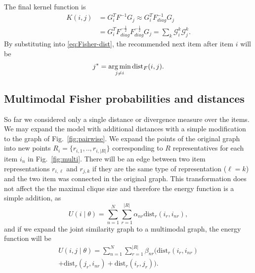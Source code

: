 The final kernel function is
%
\begin{equation}
\begin{split}
K(i,j) &= G_i^T F^{-1} G_j \approx G_i^T F_{diag}^{-1} G_j \\
	   &= G_i^T F_{diag}^{-\frac 12} F_{diag}^{-\frac 12} G_j = \sum_k \mathcal{G}_i^k \mathcal{G}_j^k.
\end{split}
\nonumber
\end{equation}
By substituting into \eqref{eq:Fisher-dist}, the recommended next item after item $i$ will be
%
\begin{equation}
j^{*} = \operatorname*{arg\,min}_{j \neq i} \text{dist}_F(i,j).
\nonumber 
\end{equation}

\subsection{Multimodal Fisher probabilities and distances}
\label{sec:fish_comb}

So far we considered only a single distance or divergence measure over the items. We may expand the model with additional distances with a simple modification to the graph of Fig.~\ref{fig:pairwise}. 
We expand the points of the original graph into new points $R_i=\{r_{i,1},..,r_{i,|R|}\}$ corresponding to $R$ representatives for each item $i_n$ in Fig.~\ref{fig:multi}. There will be an edge between two item representations $r_{i,\ell}$ and $r_{j,k}$ if they are the same type of representation ($\ell=k$) and the two item was connected in the original graph. This transformation does not affect the the maximal clique size and therefore the energy function is a simple addition, as
%
\begin{equation}
U(i \mid \theta) = \sum_{n=1}^{N} \sum_{r=1}^{|R|} \alpha_{nr} \mbox{dist}_r(i_r,i_{nr}),
\label{eq:potential_multi}
\end{equation}
% 
and if we expand the joint similarity graph to a multimodal graph, the energy function will be
%
\begin{equation}
\begin{split}
\label{eq:potential_joined_multi}
U(i,j \mid \theta) = \sum_{n=1}^{N} \sum_{r=1}^{|R|} \beta_{nr} (\mbox{dist}_r(i_r,i_{nr}) \\
+ \mbox{dist}_r(j_r,i_{nr}) + \mbox{dist}_r(i_r,j_r)).
\end{split}
\end{equation}

